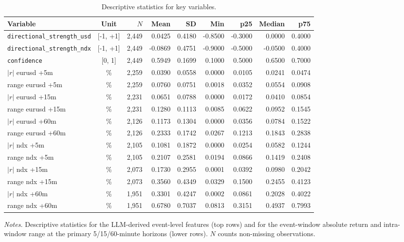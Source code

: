 \begin{table}[!htbp]
\centering
\caption{Descriptive statistics for key variables.}
\label{tab:desc-stats}
\begin{threeparttable}
\small
\begin{tabular}{lcrrrrrrr}
\toprule
\textbf{Variable} & \textbf{Unit} & \textbf{$N$} & \textbf{Mean} & \textbf{SD} & \textbf{Min} & \textbf{p25} & \textbf{Median} & \textbf{p75} \\
\midrule
\texttt{directional\_strength\_usd} & [-1, +1] & 2,449 & 0.0425 & 0.4180 & -0.8500 & -0.3000 & 0.0000 & 0.4000 \\
\texttt{directional\_strength\_ndx} & [-1, +1] & 2,449 & -0.0869 & 0.4751 & -0.9000 & -0.5000 & -0.0500 & 0.4000 \\
\texttt{confidence} & [0, 1] & 2,449 & 0.5949 & 0.1699 & 0.1000 & 0.5000 & 0.6500 & 0.7000 \\
$|r|$ eurusd +5m & \% & 2,259 & 0.0390 & 0.0558 & 0.0000 & 0.0105 & 0.0241 & 0.0474 \\
range eurusd +5m & \% & 2,259 & 0.0760 & 0.0751 & 0.0018 & 0.0352 & 0.0554 & 0.0908 \\
$|r|$ eurusd +15m & \% & 2,231 & 0.0651 & 0.0788 & 0.0000 & 0.0172 & 0.0410 & 0.0854 \\
range eurusd +15m & \% & 2,231 & 0.1280 & 0.1113 & 0.0085 & 0.0622 & 0.0952 & 0.1545 \\
$|r|$ eurusd +60m & \% & 2,126 & 0.1173 & 0.1304 & 0.0000 & 0.0356 & 0.0784 & 0.1522 \\
range eurusd +60m & \% & 2,126 & 0.2333 & 0.1742 & 0.0267 & 0.1213 & 0.1843 & 0.2838 \\
$|r|$ ndx +5m & \% & 2,105 & 0.1081 & 0.1872 & 0.0000 & 0.0254 & 0.0582 & 0.1244 \\
range ndx +5m & \% & 2,105 & 0.2107 & 0.2581 & 0.0194 & 0.0866 & 0.1419 & 0.2408 \\
$|r|$ ndx +15m & \% & 2,073 & 0.1730 & 0.2955 & 0.0001 & 0.0392 & 0.0980 & 0.2042 \\
range ndx +15m & \% & 2,073 & 0.3560 & 0.4349 & 0.0329 & 0.1500 & 0.2455 & 0.4123 \\
$|r|$ ndx +60m & \% & 1,951 & 0.3301 & 0.4247 & 0.0002 & 0.0861 & 0.2028 & 0.4022 \\
range ndx +60m & \% & 1,951 & 0.6780 & 0.7037 & 0.0813 & 0.3151 & 0.4937 & 0.7993 \\
\bottomrule
\end{tabular}
\begin{tablenotes}
\footnotesize
\item \textit{Notes.} Descriptive statistics for the LLM-derived
event-level features (top rows) and for the event-window
absolute return and intra-window range at the primary 5/15/60-minute
horizons (lower rows). $N$ counts non-missing observations.
\end{tablenotes}
\end{threeparttable}
\end{table}
